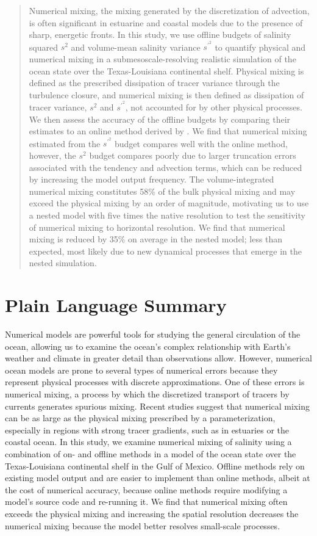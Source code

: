 \documentclass[draft]{agujournal2019}
\begin{document}
\begin{abstract}
Numerical mixing, the mixing generated by the discretization of advection, is often significant in estuarine and coastal models due to the presence of sharp, energetic fronts. In this study, we use offline budgets of salinity squared $s^2$ and volume-mean salinity variance $s^{\prime^2}$ to quantify physical and numerical mixing in a submesoscale-resolving realistic simulation of the ocean state over the Texas-Louisiana continental shelf. Physical mixing is defined as the prescribed dissipation of tracer variance through the turbulence closure, and numerical mixing is then defined as dissipation of tracer variance, $s^2$ and $s^{\prime^2}$, not accounted for by other physical processes. We then assess the accuracy of the offline budgets by comparing their estimates to an online method derived by . We find that numerical mixing estimated from the $s^{\prime^2}$ budget compares well with the online method, however, the $s^2$ budget compares poorly due to larger truncation errors associated with the tendency and advection terms, which can be reduced by increasing the model output frequency. The volume-integrated numerical mixing constitutes 58$\%$ of the bulk physical mixing and may exceed the physical mixing by an order of magnitude, motivating us to use a nested model with five times the native resolution to test the sensitivity of numerical mixing to horizontal resolution. We find that numerical mixing is reduced by 35$\%$ on average in the nested model; less than expected, most likely due to new dynamical processes that emerge in the nested simulation.
\end{abstract}

\section*{Plain Language Summary}
\noindent Numerical models are powerful tools for studying the general circulation of the ocean, allowing us to examine the ocean's complex relationship with Earth's weather and climate in greater detail than observations allow. However, numerical ocean models are prone to several types of numerical errors because they represent physical processes with discrete approximations. One of these errors is numerical mixing, a process by which the discretized transport of tracers by currents generates spurious mixing. Recent studies suggest that numerical mixing can be as large as the physical mixing prescribed by a parameterization, especially in regions with strong tracer gradients, such as in estuaries or the coastal ocean. In this study, we examine numerical mixing of salinity using a combination of on- and offline methods in a model of the ocean state over the Texas-Louisiana continental shelf in the Gulf of Mexico. Offline methods rely on existing model output and are easier to implement than online methods, albeit at the cost of numerical accuracy, because online methods require modifying a model's source code and re-running it. We find that numerical mixing often exceeds the physical mixing and increasing the spatial resolution decreases the numerical mixing because the model better resolves small-scale processes.
\end{document}

